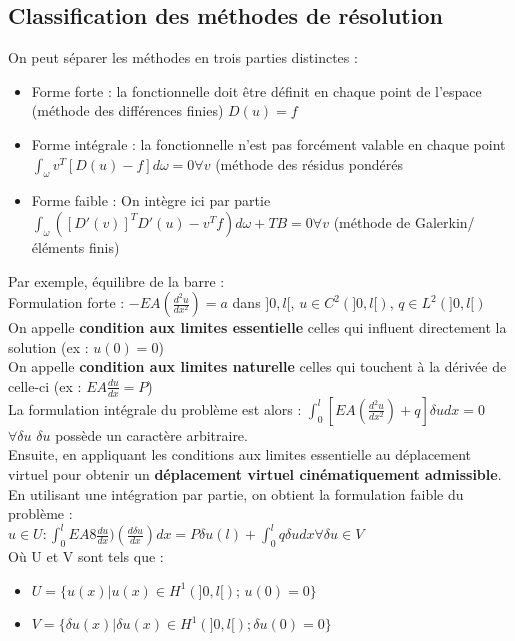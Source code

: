 \documentclass[../main.tex]{subfiles}
\begin{document}
\localtableofcontents
\subsection{Classification des méthodes de résolution}
On peut séparer les méthodes en trois parties distinctes : \\
\begin{itemize}
    \item Forme forte : la fonctionnelle doit être définit en chaque point de l'espace (méthode des différences finies) $D(u) = f$\\
    \item Forme intégrale : la fonctionnelle n'est pas forcément valable en chaque point $\int_\omega v^T [D(u)-f]d\omega = 0 \forall v$ (méthode des résidus pondérés\\
    \item Forme faible : On intègre ici par partie $\int_\omega ([D'(v)]^T D'(u) - v^T f)d\omega + TB = 0 \forall v$ (méthode de Galerkin/éléments finis)\\
\end{itemize}

Par exemple, équilibre de la barre : \\
Formulation forte : $-EA \left( \frac{d^2 u}{dx^2} \right) = a$ dans $]0,l[$, $u\in C^2(]0,l[)$, $q\in L^2 (]0,l[)$\\

On appelle \textbf{condition aux limites essentielle} celles qui influent directement la solution (ex : $u(0)=0$)\\
On appelle \textbf{condition aux limites naturelle} celles qui touchent à la dérivée de celle-ci (ex : $EA \frac{du}{dx} = P$)\\

La formulation intégrale du problème est alors : $\int_0^l [EA(\frac{d^2u}{dx^2})+q]\delta u dx = 0$ $\forall \delta u$ \warning $\delta u$ possède un caractère arbitraire.\\

Ensuite, en appliquant les conditions aux limites essentielle au déplacement virtuel pour obtenir un \textbf{déplacement virtuel cinématiquement admissible}. En utilisant une intégration par partie, on obtient la formulation faible du problème :\\
$u \in U : \int_0^l EA 8\frac{du}{dx})(\frac{d\delta u}{dx}) dx = P\delta u(l) + \int_0^l q \delta udx \forall \delta u \in V$\\

Où U et V sont tels que : \begin{itemize}
    \item $U= \{ u(x) | u(x) \in H^1(]0,l[)$; $u(0)=0\}$\\
    \item $V = \{ \delta u(x) | \delta u(x) \in H^1(]0,l[); \delta u(0) =0\}$\\
\end{itemize}
\end{document}
